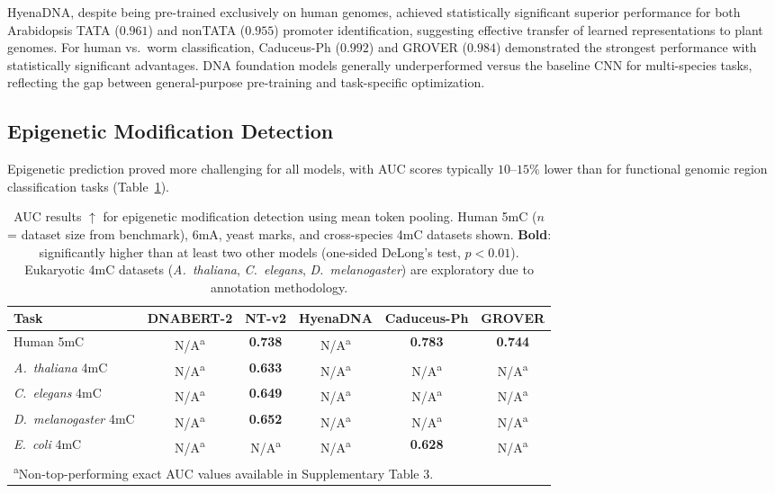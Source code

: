 \documentclass[11pt]{article}
\begin{document}
HyenaDNA, despite being pre-trained exclusively on human genomes, achieved statistically significant superior performance for both Arabidopsis TATA ($0.961$) and nonTATA ($0.955$) promoter identification, suggesting effective transfer of learned representations to plant genomes. For human vs.\ worm classification, Caduceus-Ph ($0.992$) and GROVER ($0.984$) demonstrated the strongest performance with statistically significant advantages. DNA foundation models generally underperformed versus the baseline CNN for multi-species tasks, reflecting the gap between general-purpose pre-training and task-specific optimization.

\subsection{Epigenetic Modification Detection}

Epigenetic prediction proved more challenging for all models, with AUC scores typically $10$--$15\%$ lower than for functional genomic region classification tasks (Table~\ref{tab:epigenetic}).

\begin{table}[htbp]
\centering
\caption{AUC results $\uparrow$ for epigenetic modification detection using mean token pooling. Human 5mC ($n$ = dataset size from benchmark), 6mA, yeast marks, and cross-species 4mC datasets shown. \textbf{Bold}: significantly higher than at least two other models (one-sided DeLong's test, $p < 0.01$). Eukaryotic 4mC datasets (\textit{A.\ thaliana}, \textit{C.\ elegans}, \textit{D.\ melanogaster}) are exploratory due to annotation methodology.}
\label{tab:epigenetic}
\begin{adjustbox}{max width=\textwidth}
\begin{tabular}{lccccc}
\toprule
\textbf{Task} & \textbf{DNABERT-2} & \textbf{NT-v2} & \textbf{HyenaDNA} & \textbf{Caduceus-Ph} & \textbf{GROVER} \\
\midrule
Human 5mC & N/A\textsuperscript{a} & \textbf{0.738} & N/A\textsuperscript{a} & \textbf{0.783} & \textbf{0.744} \\
\textit{A.\ thaliana} 4mC & N/A\textsuperscript{a} & \textbf{0.633} & N/A\textsuperscript{a} & N/A\textsuperscript{a} & N/A\textsuperscript{a} \\
\textit{C.\ elegans} 4mC & N/A\textsuperscript{a} & \textbf{0.649} & N/A\textsuperscript{a} & N/A\textsuperscript{a} & N/A\textsuperscript{a} \\
\textit{D.\ melanogaster} 4mC & N/A\textsuperscript{a} & \textbf{0.652} & N/A\textsuperscript{a} & N/A\textsuperscript{a} & N/A\textsuperscript{a} \\
\textit{E.\ coli} 4mC & N/A\textsuperscript{a} & N/A\textsuperscript{a} & N/A\textsuperscript{a} & \textbf{0.628} & N/A\textsuperscript{a} \\
\bottomrule
\multicolumn{6}{l}{\footnotesize \textsuperscript{a}Non-top-performing exact AUC values available in Supplementary Table 3.} \\
\end{tabular}
\end{adjustbox}
\end{table}
\end{document}
